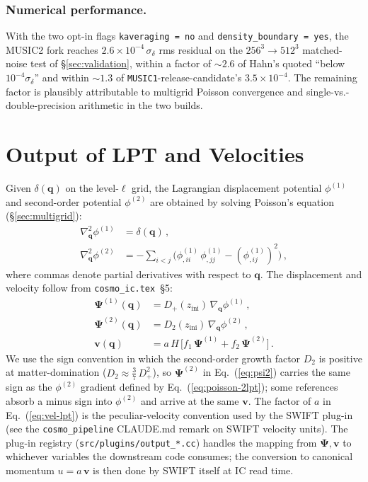 \documentclass[12pt]{article}
\newcommand{\bq}{\mathbf{q}}
\newcommand{\code}[1]{\texttt{#1}}
\begin{document}
\subsubsection*{Numerical performance.}
With the two opt-in flags \code{kaveraging = no} and
\code{density\_boundary = yes}, the MUSIC2 fork reaches
$2.6 \times 10^{-4}\,\sigma_\delta$ rms residual on the
$256^3 \to 512^3$ matched-noise test of \S\ref{sec:validation},
within a factor of $\sim 2.6$ of Hahn's quoted ``below
$10^{-4}\sigma_\delta$'' and within $\sim 1.3$ of
\texttt{MUSIC1}-release-candidate's $3.5 \times 10^{-4}$.  The
remaining factor is plausibly attributable to multigrid Poisson
convergence and single-vs.-double-precision arithmetic in the
two builds.

\section{Output of LPT and Velocities}
\label{sec:lpt-handoff}

Given $\delta(\bq)$ on the level-$\ell$ grid, the Lagrangian
displacement potential $\phi^{(1)}$ and second-order potential
$\phi^{(2)}$ are obtained by solving Poisson's equation
(\S\ref{sec:multigrid}):
\begin{align}
  \nabla_\bq^2 \phi^{(1)} &= \delta(\bq)\,,
    \label{eq:poisson-1lpt}\\
  \nabla_\bq^2 \phi^{(2)} &= -\!\!\sum_{i<j}\!
        \bigl(\phi^{(1)}_{,ii}\,\phi^{(1)}_{,jj} - (\phi^{(1)}_{,ij})^2\bigr)\,,
    \label{eq:poisson-2lpt}
\end{align}
where commas denote partial derivatives with respect to $\bq$.  The
displacement and velocity follow from \texttt{cosmo\_ic.tex}~\S5:
\begin{align}
  \boldsymbol\Psi^{(1)}(\bq) &= D_+(z_\mathrm{ini})\,\nabla_\bq \phi^{(1)}\,,
    \label{eq:psi1}\\
  \boldsymbol\Psi^{(2)}(\bq) &= D_2(z_\mathrm{ini})\,\nabla_\bq \phi^{(2)}\,,
    \label{eq:psi2}\\
  \mathbf{v}(\bq) &= a\,H\,\bigl[f_1\,\boldsymbol\Psi^{(1)} + f_2\,\boldsymbol\Psi^{(2)}\bigr]\,.
    \label{eq:vel-lpt}
\end{align}
We use the sign convention in which the second-order growth factor
$D_2$ is positive at matter-domination
($D_2 \approx \tfrac{3}{7}\,D_+^2$), so $\boldsymbol\Psi^{(2)}$ in
Eq.~(\ref{eq:psi2}) carries the same sign as the $\phi^{(2)}$
gradient defined by Eq.~(\ref{eq:poisson-2lpt}); some references
absorb a minus sign into $\phi^{(2)}$ and arrive at the same
$\mathbf{v}$.  The factor of $a$ in Eq.~(\ref{eq:vel-lpt}) is the
peculiar-velocity convention used by the SWIFT plug-in (see the
\code{cosmo\_pipeline} CLAUDE.md remark on SWIFT velocity units).
The plug-in registry (\code{src/plugins/output\_*.cc}) handles the
mapping from $\boldsymbol\Psi, \mathbf{v}$ to whichever variables
the downstream code consumes; the conversion to canonical momentum
$u = a\,\mathbf{v}$ is then done by SWIFT itself at IC read time.
\end{document}
